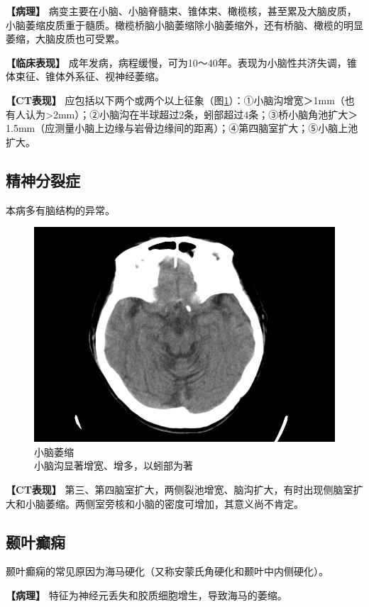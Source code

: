\textbf{【病理】}
病变主要在小脑、小脑脊髓束、锥体束、橄榄核，甚至累及大脑皮质，小脑萎缩皮质重于髓质。橄榄桥脑小脑萎缩除小脑萎缩外，还有桥脑、橄榄的明显萎缩，大脑皮质也可受累。

\textbf{【临床表现】}
成年发病，病程缓慢，可为10～40年。表现为小脑性共济失调，锥体束征、锥体外系征、视神经萎缩。

\textbf{【CT表现】}
应包括以下两个或两个以上征象（图\ref{fig2-20}）：①小脑沟增宽＞1mm（也有人认为\textgreater{}2mm）；②小脑沟在半球超过2条，蚓部超过4条；③桥小脑角池扩大＞1.5mm（应测量小脑上边缘与岩骨边缘间的距离）；④第四脑室扩大；⑤小脑上池扩大。

\subsection{精神分裂症}

本病多有脑结构的异常。

\begin{figure}[!htbp]
 \centering
 \includegraphics[width=.7\textwidth,height=\textheight,keepaspectratio]{./images/Image00036.jpg}
 \captionsetup{justification=centering}
 \caption{小脑萎缩\\{\small 小脑沟显著增宽、增多，以蚓部为著}}
 \label{fig2-20}
  \end{figure} 



\textbf{【CT表现】}
第三、第四脑室扩大，两侧裂池增宽、脑沟扩大，有时出现侧脑室扩大和小脑萎缩。两侧室旁核和小脑的密度可增加，其意义尚不肯定。

\subsection{颞叶癫痫}

颞叶癫痫的常见原因为海马硬化（又称安蒙氏角硬化和颞叶中内侧硬化）。

\textbf{【病理】} 特征为神经元丢失和胶质细胞增生，导致海马的萎缩。


